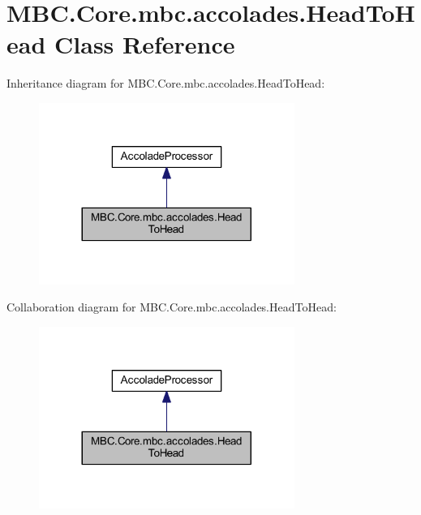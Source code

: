 \hypertarget{class_m_b_c_1_1_core_1_1mbc_1_1accolades_1_1_head_to_head}{\section{M\-B\-C.\-Core.\-mbc.\-accolades.\-Head\-To\-Head Class Reference}
\label{class_m_b_c_1_1_core_1_1mbc_1_1accolades_1_1_head_to_head}
}


Inheritance diagram for M\-B\-C.\-Core.\-mbc.\-accolades.\-Head\-To\-Head\-:\nopagebreak
\begin{figure}[H]
\begin{center}
\leavevmode
\includegraphics[width=236pt]{class_m_b_c_1_1_core_1_1mbc_1_1accolades_1_1_head_to_head__inherit__graph}
\end{center}
\end{figure}


Collaboration diagram for M\-B\-C.\-Core.\-mbc.\-accolades.\-Head\-To\-Head\-:\nopagebreak
\begin{figure}[H]
\begin{center}
\leavevmode
\includegraphics[width=236pt]{class_m_b_c_1_1_core_1_1mbc_1_1accolades_1_1_head_to_head__coll__graph}
\end{center}
\end{figure}
